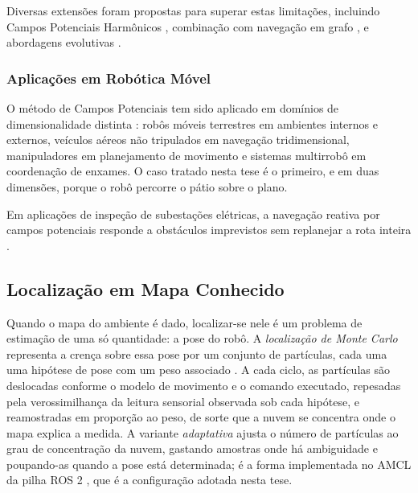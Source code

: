 Diversas extensões foram propostas para superar estas limitações, incluindo Campos Potenciais Harmônicos \cite{Connolly1990}, combinação com navegação em grafo \cite{Barraquand1992}, e abordagens evolutivas \cite{Vadakkepat2000}.

\subsubsection{Aplicações em Robótica Móvel}

O método de Campos Potenciais tem sido aplicado em domínios de dimensionalidade distinta
\cite{Siegwart2011, Arkin1998}: robôs móveis terrestres em ambientes internos e externos,
veículos aéreos não tripulados em navegação tridimensional, manipuladores em planejamento
de movimento e sistemas multirrobô em coordenação de enxames. O caso tratado nesta tese é
o primeiro, e em duas dimensões, porque o robô percorre o pátio sobre o plano.

Em aplicações de inspeção de subestações elétricas, a navegação reativa por campos potenciais responde a obstáculos imprevistos sem replanejar a rota inteira \cite{Lactec2022, Iberdrola2022}.

\subsection{Localização em Mapa Conhecido}
\label{sec:fund-localizacao}

Quando o mapa do ambiente é dado, localizar-se nele é um problema de estimação de uma só
quantidade: a pose do robô. A \emph{localização de Monte Carlo} representa a crença sobre
essa pose por um conjunto de partículas, cada uma uma hipótese de pose com um peso
associado \cite{Thrun2005}. A cada ciclo, as partículas são deslocadas conforme o modelo
de movimento e o comando executado, repesadas pela verossimilhança da leitura sensorial
observada sob cada hipótese, e reamostradas em proporção ao peso, de sorte que a nuvem se
concentra onde o mapa explica a medida. A variante \emph{adaptativa} ajusta o número de
partículas ao grau de concentração da nuvem, gastando amostras onde há ambiguidade e
poupando-as quando a pose está determinada; é a forma implementada no \ac{AMCL} da pilha
\ac{ROS} 2 \cite{Macenski2022}, que é a configuração adotada nesta tese.

